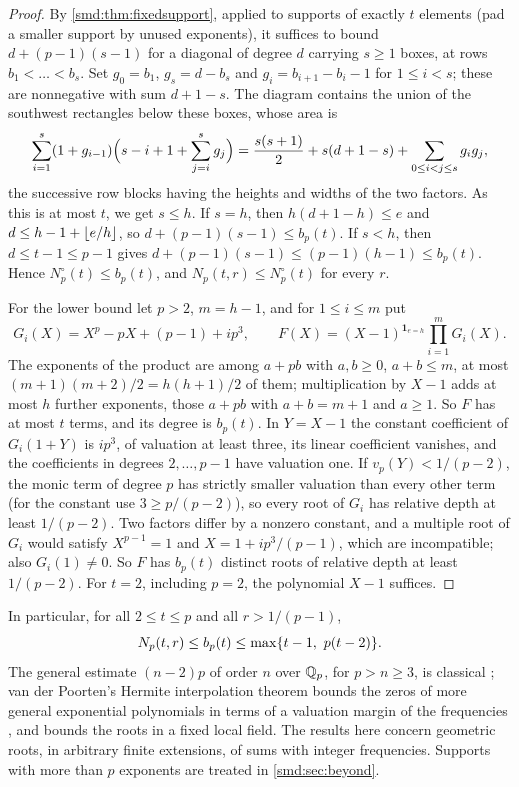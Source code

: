 \begin{proof}
By \cref{smd:thm:fixedsupport}, applied to supports of exactly $t$ elements (pad a smaller
support by unused exponents), it suffices to bound $d+(p-1)(s-1)$ for a diagonal of degree
$d$ carrying $s\ge1$ boxes, at rows $b_1<\dots<b_s$. Set $g_0=b_1$, $g_s=d-b_s$ and
$g_i=b_{i+1}-b_i-1$ for $1\le i<s$; these are nonnegative with sum $d+1-s$. The diagram
contains the union of the southwest rectangles below these boxes, whose area is
\[
 \sum_{i=1}^{s}(1+g_{i-1})\Bigl(s-i+1+\sum_{j=i}^{s}g_j\Bigr)
 =\frac{s(s+1)}2+s(d+1-s)+\sum_{0\le i<j\le s}g_ig_j ,
\]
the successive row blocks having the heights and widths of the two factors. As this is at
most $t$, we get $s\le h$. If $s=h$, then $h(d+1-h)\le e$ and $d\le h-1+\lfloor e/h\rfloor$, so
$d+(p-1)(s-1)\le b_p(t)$. If $s<h$, then $d\le t-1\le p-1$ gives
$d+(p-1)(s-1)\le(p-1)(h-1)\le b_p(t)$. Hence $N^\circ_p(t)\le b_p(t)$, and
$N_p(t,r)\le N^\circ_p(t)$ for every $r$.

For the lower bound let $p>2$, $m=h-1$, and for $1\le i\le m$ put
\[
 G_i(X)=X^p-pX+(p-1)+ip^3,\qquad
 F(X)=(X-1)^{\mathbf1_{e=h}}\prod_{i=1}^mG_i(X).
\]
The exponents of the product are among $a+pb$ with $a,b\ge0$, $a+b\le m$, at most
$(m+1)(m+2)/2=h(h+1)/2$ of them; multiplication by $X-1$ adds at most $h$ further exponents,
those $a+pb$ with $a+b=m+1$ and $a\ge1$. So $F$ has at most $t$ terms, and its degree is
$b_p(t)$. In $Y=X-1$ the constant coefficient of $G_i(1+Y)$ is $ip^3$, of valuation at least
three, its linear coefficient vanishes, and the coefficients in degrees $2,\dots,p-1$ have
valuation one. If $v_p(Y)<1/(p-2)$, the monic term of degree $p$ has strictly smaller
valuation than every other term (for the constant use $3\ge p/(p-2)$), so every root of
$G_i$ has relative depth at least $1/(p-2)$. Two factors differ by a nonzero constant, and
a multiple root of $G_i$ would satisfy $X^{p-1}=1$ and $X=1+ip^3/(p-1)$, which are
incompatible; also $G_i(1)\ne0$. So $F$ has $b_p(t)$ distinct roots of relative depth at
least $1/(p-2)$. For $t=2$, including $p=2$, the polynomial $X-1$ suffices.
\end{proof}

In particular, for all $2\le t\le p$ and all $r>1/(p-1)$,
\begin{equation}\label{smd:eq:uniform}
 N_p(t,r)\le b_p(t)\le\max\{t-1,\ p(t-2)\} .
\end{equation}
The general estimate $(n-2)p$ of order $n$ over $\mathbb{Q}_p$, for $p>n\ge3$, is classical
\cite{vanderPoortenRumely1987Zeros}; van der Poorten's Hermite interpolation theorem bounds
the zeros of more general exponential polynomials in terms of a valuation margin of the
frequencies \cite{vanderPoorten1976Hermite}, and \cite{Avendano2011Sharp} bounds the roots
in a fixed local field. The results here concern geometric roots, in arbitrary finite
extensions, of sums with integer frequencies. Supports with more than $p$ exponents are
treated in \cref{smd:sec:beyond}.

